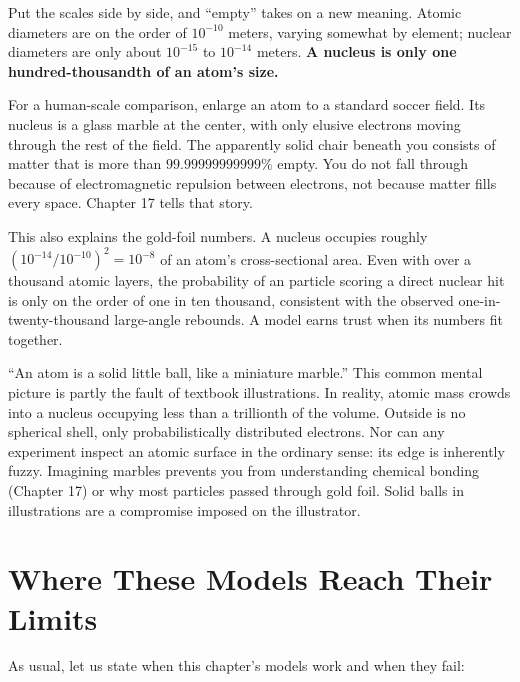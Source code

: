 Put the scales side by side, and ``empty'' takes on a new meaning. Atomic diameters are on the order of $10^{-10}$ meters, varying somewhat by element; nuclear diameters are only about $10^{-15}$ to $10^{-14}$ meters. \textbf{A nucleus is only one hundred-thousandth of an atom's size.}

For a human-scale comparison, enlarge an atom to a standard soccer field. Its nucleus is a glass marble at the center, with only elusive electrons moving through the rest of the field. The apparently solid chair beneath you consists of matter that is more than $99.99999999999\%$ empty. You do not fall through because of electromagnetic repulsion between electrons, not because matter fills every space. Chapter 17 tells that story.

This also explains the gold-foil numbers. A nucleus occupies roughly $(10^{-14}/10^{-10})^2 = 10^{-8}$ of an atom's cross-sectional area. Even with over a thousand atomic layers, the probability of an \chem{\alpha} particle scoring a direct nuclear hit is only on the order of one in ten thousand, consistent with the observed one-in-twenty-thousand large-angle rebounds. A model earns trust when its numbers fit together.

\begin{wuqu}
``An atom is a solid little ball, like a miniature marble.'' This common mental picture is partly the fault of textbook illustrations. In reality, atomic mass crowds into a nucleus occupying less than a trillionth of the volume. Outside is no spherical shell, only probabilistically distributed electrons. Nor can any experiment inspect an atomic surface in the ordinary sense: its edge is inherently fuzzy. Imagining marbles prevents you from understanding chemical bonding (Chapter 17) or why most particles passed through gold foil. Solid balls in illustrations are a compromise imposed on the illustrator.
\end{wuqu}

\section{Where These Models Reach Their Limits}

As usual, let us state when this chapter's models work and when they fail:

